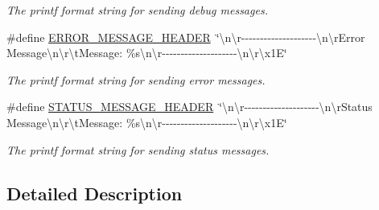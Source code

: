 \begin{DoxyCompactItemize}
\begin{DoxyCompactList}\small\item\em The printf format string for sending debug messages. \end{DoxyCompactList}\item 
\hypertarget{group__tekdaqc__communication_ga6ea1aa40205a4de746a611315727ab7d}{\#define \hyperlink{group__tekdaqc__communication_ga6ea1aa40205a4de746a611315727ab7d}{E\-R\-R\-O\-R\-\_\-\-M\-E\-S\-S\-A\-G\-E\-\_\-\-H\-E\-A\-D\-E\-R}~\char`\"{}\textbackslash{}n\textbackslash{}r-\/-\/-\/-\/-\/-\/-\/-\/-\/-\/-\/-\/-\/-\/-\/-\/-\/-\/-\/-\/\textbackslash{}n\textbackslash{}r\-Error Message\textbackslash{}n\textbackslash{}r\textbackslash{}t\-Message\-: \%s\textbackslash{}n\textbackslash{}r-\/-\/-\/-\/-\/-\/-\/-\/-\/-\/-\/-\/-\/-\/-\/-\/-\/-\/-\/-\/\textbackslash{}n\textbackslash{}r\textbackslash{}x1\-E\char`\"{}}\label{group__tekdaqc__communication_ga6ea1aa40205a4de746a611315727ab7d}

\begin{DoxyCompactList}\small\item\em The printf format string for sending error messages. \end{DoxyCompactList}\item 
\hypertarget{group__tekdaqc__communication_gaed5fb544cd079f2880ed56a2b4ed7015}{\#define \hyperlink{group__tekdaqc__communication_gaed5fb544cd079f2880ed56a2b4ed7015}{S\-T\-A\-T\-U\-S\-\_\-\-M\-E\-S\-S\-A\-G\-E\-\_\-\-H\-E\-A\-D\-E\-R}~\char`\"{}\textbackslash{}n\textbackslash{}r-\/-\/-\/-\/-\/-\/-\/-\/-\/-\/-\/-\/-\/-\/-\/-\/-\/-\/-\/-\/\textbackslash{}n\textbackslash{}r\-Status Message\textbackslash{}n\textbackslash{}r\textbackslash{}t\-Message\-: \%s\textbackslash{}n\textbackslash{}r-\/-\/-\/-\/-\/-\/-\/-\/-\/-\/-\/-\/-\/-\/-\/-\/-\/-\/-\/-\/\textbackslash{}n\textbackslash{}r\textbackslash{}x1\-E\char`\"{}}\label{group__tekdaqc__communication_gaed5fb544cd079f2880ed56a2b4ed7015}

\begin{DoxyCompactList}\small\item\em The printf format string for sending status messages. \end{DoxyCompactList}\end{DoxyCompactItemize}


\subsection{Detailed Description}
